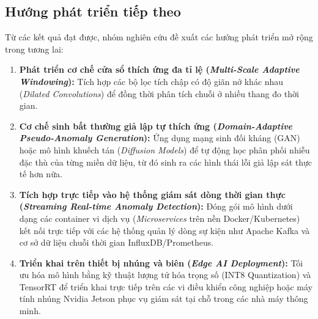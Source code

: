\documentclass[11pt,journal,onecolumn]{IEEEtran}
\begin{document}
\subsection{Hướng phát triển tiếp theo}
Từ các kết quả đạt được, nhóm nghiên cứu đề xuất các hướng phát triển mở rộng trong tương lai:
\begin{enumerate}
    \item \textbf{Phát triển cơ chế cửa sổ thích ứng đa tỉ lệ (\textit{Multi-Scale Adaptive Windowing}):} Tích hợp các bộ lọc tích chập có độ giãn nở khác nhau (\textit{Dilated Convolutions}) để đồng thời phân tích chuỗi ở nhiều thang đo thời gian.
    \item \textbf{Cơ chế sinh bất thường giả lập tự thích ứng (\textit{Domain-Adaptive Pseudo-Anomaly Generation}):} Ứng dụng mạng sinh đối kháng (GAN) hoặc mô hình khuếch tán (\textit{Diffusion Models}) để tự động học phân phối nhiễu đặc thù của từng miền dữ liệu, từ đó sinh ra các hình thái lỗi giả lập sát thực tế hơn nữa.
    \item \textbf{Tích hợp trực tiếp vào hệ thống giám sát dòng thời gian thực (\textit{Streaming Real-time Anomaly Detection}):} Đóng gói mô hình dưới dạng các container vi dịch vụ (\textit{Microservices} trên nền Docker/Kubernetes) kết nối trực tiếp với các hệ thống quản lý dòng sự kiện như Apache Kafka và cơ sở dữ liệu chuỗi thời gian InfluxDB/Prometheus.
    \item \textbf{Triển khai trên thiết bị nhúng và biên (\textit{Edge AI Deployment}):} Tối ưu hóa mô hình bằng kỹ thuật lượng tử hóa trọng số (INT8 Quantization) và TensorRT để triển khai trực tiếp trên các vi điều khiển công nghiệp hoặc máy tính nhúng Nvidia Jetson phục vụ giám sát tại chỗ trong các nhà máy thông minh.
\end{enumerate}
\end{document}
